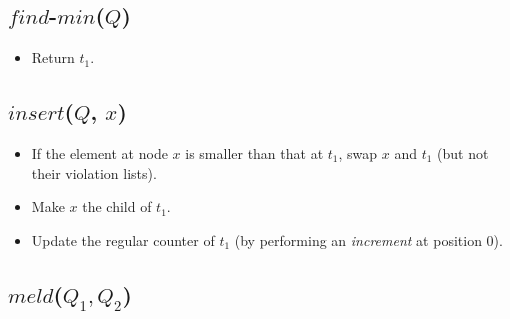 \documentclass{llncs}
\newcommand{\Findmin}{\mbox{$\mathit{find}$\mbox{\rm -}$\mathit{min}$}}
\newcommand{\Insert}{\mbox{$\mathit{insert}$}}
\newcommand{\Meld}{\mbox{$\mathit{meld}$}}
\begin{document}
\subsection*{\Findmin{}($Q$)}
\begin{itemize}
\item Return $t_1$.
\end{itemize}

\subsection*{\Insert{}($Q$, $x$)}

\begin{itemize}
\item If the element at node $x$ is smaller than that at 
  $t_1$,
 swap $x$ and $t_1$ (but not their violation lists).
\item Make $x$ the child of $t_1$.
\item Update the regular counter of $t_1$ (by performing an {\it increment} at position $0$).
\end{itemize}

\subsection*{\Meld{}($Q_1, Q_2$)}
\end{document}
